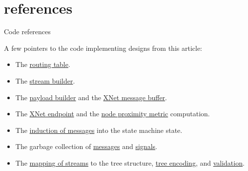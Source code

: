 \documentclass{article}
\begin{document}
\section{references}{Code references}

A few pointers to the code implementing designs from this article:
\begin{itemize}
  \item The \href{https://github.com/dfinity/ic/blob/226faa85b945aabf0fc22a18b4c2e1b9f0f4c8ee/rs/registry/routing_table/src/lib.rs#L213}{routing table}.
  \item The \href{https://github.com/dfinity/ic/blob/226faa85b945aabf0fc22a18b4c2e1b9f0f4c8ee/rs/messaging/src/routing/stream_builder.rs#L237}{stream builder}.
  \item The \href{https://github.com/dfinity/ic/blob/226faa85b945aabf0fc22a18b4c2e1b9f0f4c8ee/rs/xnet/payload_builder/src/lib.rs#L665}{payload builder} and the \href{https://github.com/dfinity/ic/blob/226faa85b945aabf0fc22a18b4c2e1b9f0f4c8ee/rs/xnet/payload_builder/src/certified_slice_pool.rs#L1042}{XNet message buffer}.
  \item The \href{https://github.com/dfinity/ic/blob/226faa85b945aabf0fc22a18b4c2e1b9f0f4c8ee/rs/xnet/endpoint/src/lib.rs#L93}{XNet endpoint} and the \href{https://github.com/dfinity/ic/blob/226faa85b945aabf0fc22a18b4c2e1b9f0f4c8ee/rs/xnet/payload_builder/src/proximity.rs#L118}{node proximity metric} computation.
  \item The \href{https://github.com/dfinity/ic/blob/226faa85b945aabf0fc22a18b4c2e1b9f0f4c8ee/rs/messaging/src/routing/stream_handler.rs#L557}{induction of messages} into the state machine state.
  \item The garbage collection of \href{https://github.com/dfinity/ic/blob/226faa85b945aabf0fc22a18b4c2e1b9f0f4c8ee/rs/messaging/src/routing/stream_handler.rs#L391-L426}{messages} and \href{https://github.com/dfinity/ic/blob/226faa85b945aabf0fc22a18b4c2e1b9f0f4c8ee/rs/messaging/src/routing/stream_handler.rs#L428-L465}{signals}.
  \item The \href{https://github.com/dfinity/ic/blob/226faa85b945aabf0fc22a18b4c2e1b9f0f4c8ee/rs/canonical_state/src/lazy_tree/conversion.rs#L254-L284}{mapping of streams} to the tree structure, \href{https://github.com/dfinity/ic/blob/226faa85b945aabf0fc22a18b4c2e1b9f0f4c8ee/rs/state_manager/src/stream_encoding.rs#L40}{tree encoding}, and \href{https://github.com/dfinity/ic/blob/226faa85b945aabf0fc22a18b4c2e1b9f0f4c8ee/rs/state_manager/src/lib.rs#L2912-L2972}{validation}.
\end{itemize}
\end{document}
